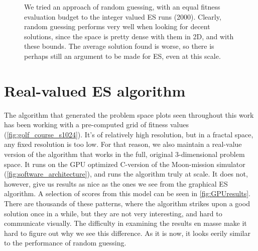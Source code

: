 \begin{figure}[ht]
    \hfill
    \caption{We tried an approach of random guessing, with an equal fitness evaluation budget to the integer valued ES runs (2000). Clearly, random guessing performs very well when looking for decent solutions, since the space is pretty dense with them in 2D, and with these bounds. The average solution found is worse, so there is perhaps still an argument to be made for ES, even at this scale.}
    \label{fig:randomguessingufig} 
\end{figure} 

\section{Real-valued ES algorithm}
The algorithm that generated the problem space plots seen throughout this work has been working with a pre-computed grid of fitness values (\cref{fig:golf_course_s1024}). It's of relatively high resolution, but in a fractal space, any fixed resolution is too low. For that reason, we also maintain a real-value version of the algorithm that works in the full, original 3-dimensional problem space. It runs on the GPU optimized C-version of the Moon-mission simulator (\cref{fig:software_architecture}), and runs the algorithm truly at scale. It does not, however, give us results as nice as the ones we see from the graphical ES algorithm. A selection of scores from this model can be seen in \cref{fig:GPUresults}. There are thousands of these patterns, where the algorithm strikes upon a good solution once in a while, but they are not very interesting, and hard to communicate visually. The difficulty in examining the results en masse make it hard to figure out why we see this difference. As it is now, it looks eerily similar to the performance of random guessing.


